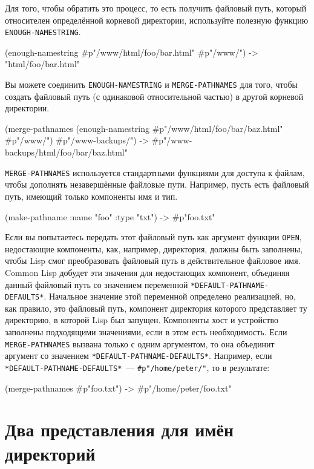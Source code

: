 Для того, чтобы обратить это процесс, то есть получить файловый путь, который относителен
определённой корневой директории, используйте полезную функцию \lstinline{ENOUGH-NAMESTRING}.

\begin{myverb}
(enough-namestring #p"/www/html/foo/bar.html" #p"/www/") -> "html/foo/bar.html" 
\end{myverb}

Вы можете соединить \lstinline{ENOUGH-NAMESTRING} и \lstinline{MERGE-PATHNAMES} для того, чтобы
создать файловый путь (с одинаковой относительной частью) в другой корневой директории.

\begin{myverb}
(merge-pathnames 
  (enough-namestring #p"/www/html/foo/bar/baz.html" #p"/www/") 
  #p"/www-backups/") ->   #p"/www-backups/html/foo/bar/baz.html" 
\end{myverb}

\lstinline{MERGE-PATHNAMES} используется стандартными функциями для доступа к файлам, чтобы
дополнять незавершённые файловые пути. Например, пусть есть файловый путь, имеющий только
компоненты имя и тип.

\begin{myverb}
(make-pathname :name "foo" :type "txt") -> #p"foo.txt" 
\end{myverb}

Если вы попытаетесь передать этот файловый путь как аргумент функции \lstinline{OPEN},
недостающие компоненты, как, например, директория, должны быть заполнены, чтобы Lisp смог
преобразовать файловый путь в действительное файловое имя. Common Lisp добудет эти
значения для недостающих компонент, объединяя данный файловый путь со значением переменной
\lstinline{*DEFAULT-PATHNAME-DEFAULTS*}. Начальное значение этой переменной определено
реализацией, но, как правило, это файловый путь, компонент директория которого
представляет ту директорию, в которой Lisp был запущен. Компоненты хост и устройство
заполнены подходящими значениями, если в этом есть необходимость. Если
\lstinline{MERGE-PATHNAMES} вызвана только с одним аргументом, то она объединит аргумент со
значением \lstinline{*DEFAULT-PATHNAME-DEFAULTS*}. Например, если
\lstinline{*DEFAULT-PATHNAME-DEFAULTS*}~--- \lstinline!#p"/home/peter/"!, то в результате:

\begin{myverb}
(merge-pathnames #p"foo.txt") -> #p"/home/peter/foo.txt" 
\end{myverb}

\section{Два представления для имён директорий}

